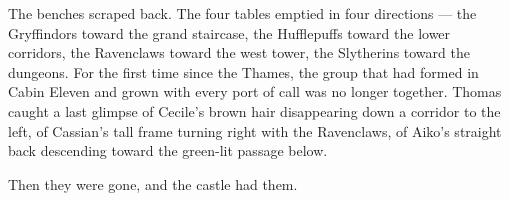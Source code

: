 The benches scraped back. The four tables emptied in four directions --- the Gryffindors toward the grand staircase, the Hufflepuffs toward the lower corridors, the Ravenclaws toward the west tower, the Slytherins toward the dungeons. For the first time since the Thames, the group that had formed in Cabin Eleven and grown with every port of call was no longer together. Thomas caught a last glimpse of Cecile's brown hair disappearing down a corridor to the left, of Cassian's tall frame turning right with the Ravenclaws, of Aiko's straight back descending toward the green-lit passage below.

Then they were gone, and the castle had them.


















